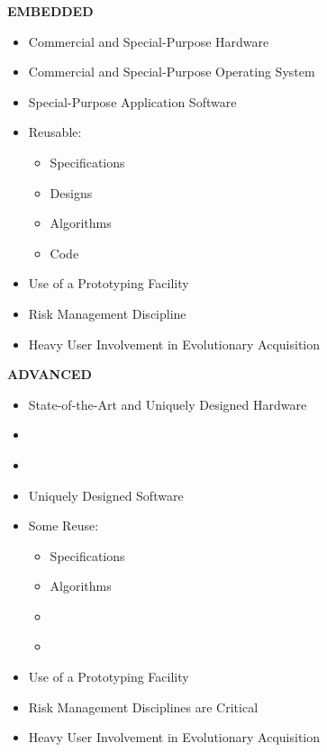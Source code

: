 \documentclass[12pt,final]{article}
\begin{document}
\begin{landscape}
\begin{center}
\begin{multicols*}{4}
    \textbf{EMBEDDED}
    \begin{itemize}
        \item Commercial and Special-Purpose Hardware
        \item Commercial and Special-Purpose Operating System
        \item Special-Purpose Application Software
        \item Reusable:
        \begin{itemize}
            \item Specifications
            \item Designs
            \item Algorithms
            \item Code
        \end{itemize}
        \item Use of a Prototyping Facility
        \item Risk Management Discipline
        \item Heavy User Involvement in Evolutionary Acquisition
    \end{itemize}

    \columnbreak

    \textbf{ADVANCED}

    \begin{itemize}
        \item State-of-the-Art and Uniquely Designed Hardware
        \item[] ~
        \item[] ~
        \item Uniquely Designed Software
        \item Some Reuse:
        \begin{itemize}
            \item Specifications
            \item Algorithms
        \item[] ~
        \item[] ~
        \end{itemize}
        \item Use of a Prototyping Facility
        \item Risk Management Disciplines are Critical
        \item Heavy User Involvement in Evolutionary Acquisition
    \end{itemize}

\end{multicols*}
\end{center}


\end{landscape}
\end{document}

